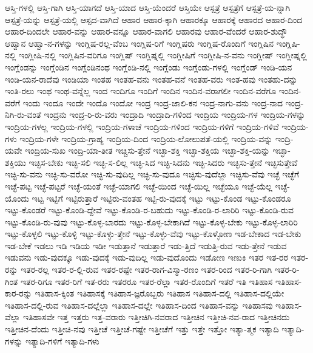 {ಆಸ್ತಿ-ಗಳಲ್ಲಿ
ಆಸ್ತಿ-ಗಾಗಿ
ಆಸ್ತಿ-ಯಾಗದೆ
ಆಸ್ತಿ-ಯಾದ
ಆಸ್ತಿ-ಯೆಂದರೆ
ಆಸ್ತಿಯೇ
ಆಸ್ಪತ್ರೆ
ಆಸ್ಪತ್ರೆಗೆ
ಆಸ್ಪತ್ರೆ-ಯ-ನ್ನಾಗಿ
ಆಸ್ಪತ್ರೆ-ಯನ್ನು
ಆಸ್ಪತ್ರೆ-ಯಲ್ಲಿ
ಆಸ್ಪದ-ವಾಗಿದೆ
ಆಹಾರ
ಆಹಾರ-ಕ್ಕಾಗಿ
ಆಹಾರಕ್ಕೂ
ಆಹಾರಕ್ಕೆ
ಆಹಾರದ
ಆಹಾರ-ದಿಂದ
ಆಹಾರ-ದಿಂದಲೇ
ಆಹಾರ-ವನ್ನು
ಆಹಾರ-ವನ್ನೂ
ಆಹಾರ-ವಾಗಲಿ
ಆಹಾರವು
ಆಹಾರ-ವೆಂದರೆ
ಆಹಾರ-ಶುದ್ಧೌ
ಆಹ್ವಾನ
ಆಹ್ವಾ-ನ-ಗಳನ್ನು
ಇಂಗ್ಲಿಷ-ರಲ್ಲ-ವೆಂಬ
ಇಂಗ್ಲಿಷ-ರಿಗೆ
ಇಂಗ್ಲಿಷರು
ಇಂಗ್ಲಿಷ-ರೊಂದಿಗೆ
ಇಂಗ್ಲಿಷಿನ
ಇಂಗ್ಲಿಷಿ-ನಲ್ಲಿ
ಇಂಗ್ಲೀಷಿ-ನಲ್ಲಿ
ಇಂಗ್ಲಿಷಿನ-ವರಿಗೂ
ಇಂಗ್ಲಿಷ್
ಇಂಗ್ಲಿಷ್ನಲ್ಲಿ
ಇಂಗ್ಲೀಷಿಗೆ
ಇಂಗ್ಲೀಷಿ-ನ-ವನು
ಇಂಗ್ಲೀಷ್
ಇಂಗ್ಲೀಷ್ನಲ್ಲಿ
ಇಂಗ್ಲೆಂಡನ್ನು
ಇಂಗ್ಲೆಂಡಿನ
ಇಂಗ್ಲೆಂಡಿನಂಥ
ಇಂಗ್ಲೆಂಡಿ-ನಲ್ಲಿ
ಇಂಗ್ಲೆಂಡು
ಇಂಗ್ಲೆಂಡು-ಗಳಲ್ಲಿ
ಇಂಗ್ಲೆಂಡ್
ಇಂಡಿ-ಯನ
ಇಂಡಿ-ಯನ-ರಾದೆವು
ಇಂಡಿಯಾ
ಇಂತಹ
ಇಂತಹ-ವನು
ಇಂತಹ-ವನೆ
ಇಂತಹ-ವರು
ಇಂತ-ಹವು
ಇಂತಹು-ದನ್ನು
ಇಂತಿ-ರಲು
ಇಂಥ
ಇಂಥ-ವನ್ನೆಲ್ಲ
ಇಂದ
ಇಂದಿಗೂ
ಇಂದಿಗೆ
ಇಂದಿನ
ಇಂದಿನ-ವರಾಗಲೀ
ಇಂದಿನ-ವರೆಗೂ
ಇಂದಿನ-ವರೆಗೆ
ಇಂದು
ಇಂದೂ
ಇಂದೇ
ಇಂದೊ
ಇಂದೋ
ಇಂದ್ರ
ಇಂದ್ರ-ಜಾಲಿ-ಕನ
ಇಂದ್ರ-ನಾಗು-ವನು
ಇಂದ್ರ-ನಾದ
ಇಂದ್ರ-ನಿಗಿ-ರು-ವಂತೆ
ಇಂದ್ರನು
ಇಂದ್ರ-ರಿ-ರು-ವರು
ಇಂದ್ರಾದಿ
ಇಂದ್ರಾದಿ-ಗಳಿಂದ
ಇಂದ್ರಿಯ
ಇಂದ್ರಿಯ-ಗಳ
ಇಂದ್ರಿಯ-ಗಳನ್ನು
ಇಂದ್ರಿಯ-ಗಳಲ್ಲ
ಇಂದ್ರಿಯ-ಗಳಲ್ಲಿ
ಇಂದ್ರಿಯ-ಗಳಾಚೆ
ಇಂದ್ರಿಯ-ಗಳಿಂದ
ಇಂದ್ರಿಯ-ಗಳಿಗೆ
ಇಂದ್ರಿಯ-ಗಳಿವೆ
ಇಂದ್ರಿಯ-ಗಳು
ಇಂದ್ರಿಯ-ಗಳೇ
ಇಂದ್ರಿಯ-ಗ್ರಾಹ್ಯ
ಇಂದ್ರಿಯ-ದಿಂದ
ಇಂದ್ರಿಯ-ಲೋಲುಪತೆ-ಯಲ್ಲಿ
ಇಂದ್ರಿಯ-ವನ್ನು
ಇಂದ್ರಿ-ಯವೇ
ಇಂದ್ರಿಯ-ಸುಖ
ಇಂದ್ರಿ-ಯಾ-ತೀತ
ಇಚ್ಚಿಸು-ತ್ತೇನೆ
ಇಚ್ಛಾ-ಶಕ್ತಿ
ಇಚ್ಛಾ-ಶಕ್ತಿಯ
ಇಚ್ಛಾ-ಶಕ್ತಿ-ಯನ್ನು
ಇಚ್ಛಾ-ಶಕ್ತಿಯು
ಇಚ್ಛಿಸ-ಬೇಕು
ಇಚ್ಛಿ-ಸಲಿ
ಇಚ್ಛಿ-ಸ-ಲಿಲ್ಲ
ಇಚ್ಛಿ-ಸಿದ
ಇಚ್ಛಿ-ಸಿದನು
ಇಚ್ಛಿ-ಸಿದರು
ಇಚ್ಛಿಸು-ತ್ತೇನೆ
ಇಚ್ಛಿಸುತ್ತೇವೆ
ಇಚ್ಛಿ-ಸು-ವನು
ಇಚ್ಛಿ-ಸು-ವರೋ
ಇಚ್ಛಿ-ಸು-ವುದಿಲ್ಲ
ಇಚ್ಛಿ-ಸು-ವುದೂ
ಇಚ್ಛಿಸು-ವುದೆಲ್ಲಾ
ಇಚ್ಛಿಸು-ವೆವು
ಇಚ್ಛೆ
ಇಚ್ಛೆಗೆ
ಇಚ್ಛೆ-ಪಟ್ಟ
ಇಚ್ಛೆ-ಪಟ್ಟರೆ
ಇಚ್ಛೆ-ಯಂತೆ
ಇಚ್ಛೆ-ಯಾಗಲಿ
ಇಚ್ಛೆ-ಯಿಂದ
ಇಚ್ಛೆ-ಯಿಲ್ಲ
ಇಚ್ಛೆಯೂ
ಇಚ್ಛೆ-ಯೆಲ್ಲ
ಇಚ್ಛೆ-ಯೊಂದು
ಇಟ್ಟ
ಇಟ್ಟಿಗೆ
ಇಟ್ಟಿರುತ್ತಾರೆ
ಇಟ್ಟಿರು-ವಂತಹ
ಇಟ್ಟಿ-ರು-ವುದಕ್ಕೆ
ಇಟ್ಟು
ಇಟ್ಟು-ಕೊಂಡ
ಇಟ್ಟು-ಕೊಂಡರೂ
ಇಟ್ಟು-ಕೊಂಡರೆ
ಇಟ್ಟು-ಕೊಂಡಿ-ದ್ದೇವೆ
ಇಟ್ಟು-ಕೊಂಡಿ-ರ-ಬಹುದು
ಇಟ್ಟು-ಕೊಂಡಿ-ರ-ಲಾರಿರಿ
ಇಟ್ಟು-ಕೊಂಡಿ-ರುವ
ಇಟ್ಟು-ಕೊಂಡಿ-ರು-ವುವು
ಇಟ್ಟು-ಕೊಳ್ಳ-ಬಾರದು
ಇಟ್ಟು-ಕೊಳ್ಳ-ಬೇಕಾಗಿದೆ
ಇಟ್ಟು-ಕೊಳ್ಳ-ಬೇಕು
ಇಟ್ಟು-ಕೊಳ್ಳ-ಲಾರಿರಿ
ಇಟ್ಟು-ಕೊಳ್ಳಲಿ
ಇಟ್ಟು-ಕೊಳ್ಳಿ
ಇಟ್ಟು-ಕೊಳ್ಳು-ತ್ತೇನೆ
ಇಟ್ಟು-ಕೊಳ್ಳು-ವೆವು
ಇಟ್ಟು-ಕೊಳ್ಳೋಣ
ಇಡ-ಬೇಕಾದ
ಇಡ-ಬೇಕು
ಇಡ-ಬೇಕೆ
ಇಡಲು
ಇಡಿ
ಇಡಿಯ
ಇಡೀ
ಇಡುತ್ತಾನೆ
ಇಡುತ್ತಾರೆ
ಇಡು-ತ್ತಿದೆ
ಇಡುತ್ತಿ-ರುವ
ಇಡು-ತ್ತೇನೆ
ಇಡುವ
ಇಡುವನು
ಇಡು-ವುದಕ್ಕೂ
ಇಡು-ವುದಕ್ಕೆ
ಇಡು-ವುದಿಲ್ಲ
ಇಡು-ವುದೊಂದು
ಇಡೋಣ
ಇಣುಕಿ
ಇತರ
ಇತ-ರರ
ಇತರ-ರನ್ನು
ಇತರ-ರಲ್ಲ
ಇತರ-ರ-ಲ್ಲಿ-ರುವ
ಇತರ-ರಷ್ಟೇ
ಇತರ-ರಾಗ-ವಿಸ್ಮಾ-ರಣಂ
ಇತರ-ರಿಂದ
ಇತರ-ರಿ-ಗಾಗಿ
ಇತರ-ರಿ-ಗಿಂತ
ಇತರ-ರಿಗೂ
ಇತರ-ರಿಗೆ
ಇತ-ರರು
ಇತರರೂ
ಇತರ-ರೆಲ್ಲಾ
ಇತರ-ರೊಂದಿಗೆ
ಇತರೆ
ಇತಿ
ಇತಿಹಾಸ
ಇತಿಹಾಸ-ಕಾರ-ರನ್ನು
ಇತಿಹಾಸ-ಕ್ಕಿಂತ
ಇತಿಹಾಸಕ್ಕೆ
ಇತಿಹಾಸ-ಜ್ಞರೊಬ್ಬರು
ಇತಿಹಾಸ
ಇತಿಹಾಸ-ದಲ್ಲಿ
ಇತಿಹಾಸ-ದಲ್ಲಿಯೇ
ಇತಿಹಾಸ-ದಲ್ಲಿ-ರುವ
ಇತಿಹಾಸ-ದಲ್ಲೆಲ್ಲಾ
ಇತಿಹಾಸ-ದಲ್ಲೇ
ಇತಿಹಾಸ-ದಿಂದ
ಇತಿಹಾಸ-ವನ್ನು
ಇತಿಹಾಸವು
ಇತಿಹಾಸ-ವೆಲ್ಲಾ
ಇತಿಹಾಸವೇ
ಇತ್ತ
ಇತ್ತರು
ಇತ್ತ-ವರಾರು
ಇತ್ತೀಚಿಗಿ-ನವರಾದ
ಇತ್ತೀಚಿನ
ಇತ್ತೀಚಿ-ನವ-ರಾದ
ಇತ್ತೀಚಿನದು
ಇತ್ತೀಚಿನ-ದೆಂದು
ಇತ್ತೀಚಿ-ನವು
ಇತ್ತೀಚೆ
ಇತ್ತೀಚೆ-ಗಷ್ಟೇ
ಇತ್ತೀಚೆಗೆ
ಇತ್ತು
ಇತ್ತೇ
ಇತ್ತೋ
ಇತ್ಯಾ-ತ್ಮಕ
ಇತ್ಯಾದಿ
ಇತ್ಯಾದಿ-ಗಳನ್ನು
ಇತ್ಯಾದಿ-ಗಳಿಗೆ
ಇತ್ಯಾದಿ-ಗಳು
}
